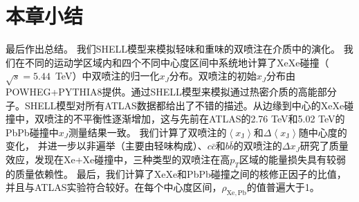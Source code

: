 \section{本章小结}

	最后作出总结。	我们SHELL模型来模拟轻味和重味的双喷注在介质中的演化。
	我们在不同的运动学区域内和四个不同中心度区间中系统地计算了XeXe碰撞（$\sqrt{s}=5.44$~TeV）中双喷注的归一化$x_J$分布。双喷注的初始$x_J$分布由POWHEG+PYTHIA8提供。通过SHELL模型来模拟通过热密介质的高能部分子。SHELL模型对所有ATLAS数据都给出了不错的描述。从边缘到中心的XeXe碰撞中，双喷注的不平衡性逐渐增加，这与先前在ATLAS的2.76 TeV和5.02 TeV的PbPb碰撞中$x_J$测量结果一致。
	我们计算了双喷注的$\left\langle x_{\mathrm{J}}\right\rangle$和$\Delta\left\langle x_{\mathrm{J}}\right\rangle$随中心度的变化，
	并进一步以非遍举（主要由轻味构成）、$c\bar{c}$和$b\bar{b}$的双喷注的$\Delta x_J$研究了质量效应，发现在Xe+Xe碰撞中，三种类型的双喷注在高$p_T$区域的能量损失具有较弱的质量依赖性。	
	最后，我们计算了XeXe和PbPb碰撞之间的核修正因子的比值，并且与ATLAS实验符合较好。在每个中心度区间，$\rho_{\mathrm{Xe,Pb}}$的值普遍大于1。
	



